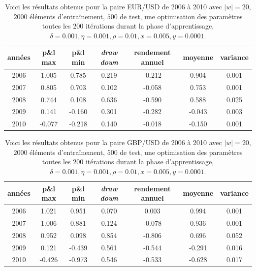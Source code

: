 \documentclass[a4paper, 11pt]{article}
\begin{document}
\begin{table}[h!]
	\centering
	\begin{tabular}{|c|c|c|c|c|c|c|}
		\hline
		années & p\&l max & p\&l min & \textit{draw down} & rendement annuel & moyenne & variance\\
		\hline
		2006 & 1.005 & 0.785 & 0.219 & -0.212 & 0.904 & 0.001\\
		\hline
		2007 & 0.805 & 0.703 & 0.102 & -0.058 & 0.753 & 0.001\\
		\hline
		2008 & 0.744 & 0.108 & 0.636 & -0.590 & 0.588 & 0.025\\
		\hline
		2009 & 0.141 & -0.160 & 0.301 & -0.282 & -0.043 & 0.003\\
		\hline
		2010 & -0.077 & -0.218 & 0.140 & -0.018 & -0.150 & 0.001\\
		\hline
	\end{tabular}
\caption{Voici les résultats obtenus pour la paire EUR/USD de 2006 à 2010 avec $|w| = 20$, $2000$ éléments d'entraînement, $500$ de test, une optimisation des
	paramètres toutes les $200$ itérations durant la phase d'apprentissage, $\delta = 0.001, \eta=0.001,\rho=0.01, x = 0.005, y=0.0001$.}
\end{table}

\begin{table}[h!]
	\centering
	\begin{tabular}{|c|c|c|c|c|c|c|}
		\hline
		années & p\&l max & p\&l min & \textit{draw down} & rendement annuel & moyenne & variance\\
		\hline
		2006 & 1.021 & 0.951 & 0.070 & 0.003 & 0.994 & 0.001\\
		\hline
		2007 & 1.006 & 0.881 & 0.124 & -0.078 & 0.936 & 0.001\\
		\hline
		2008 & 0.952 & 0.098 & 0.854 & -0.806 & 0.696 & 0.052\\
		\hline
		2009 & 0.121 & -0.439 & 0.561 & -0.544 & -0.291 & 0.016\\
		\hline
		2010 & -0.426 & -0.973 & 0.546 & -0.533 & -0.628 & 0.017\\
		\hline
	\end{tabular}
	\caption{Voici les résultats obtenus pour la paire GBP/USD de 2006 à 2010 avec $|w| = 20$, $2000$ éléments d'entraînement, $500$ de test, une optimisation des
		paramètres toutes les $200$ itérations durant la phase d'apprentissage, $\delta = 0.001, \eta=0.001,\rho=0.01, x = 0.005, y=0.0001$.}
\end{table}
\end{document}
